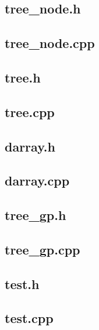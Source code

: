 \documentclass[12pt]{article}
\begin{document}
\subsection{tree\_node.h}


\subsection{tree\_node.cpp}


\subsection{tree.h}


\subsection{tree.cpp}
\label{sec:tree.cpp}


\subsection{darray.h}


\subsection{darray.cpp}


\subsection{tree\_gp.h}


\subsection{tree\_gp.cpp}
\label{sec:tree-gp.cpp}


\subsection{test.h}


\subsection{test.cpp}

\end{document}

